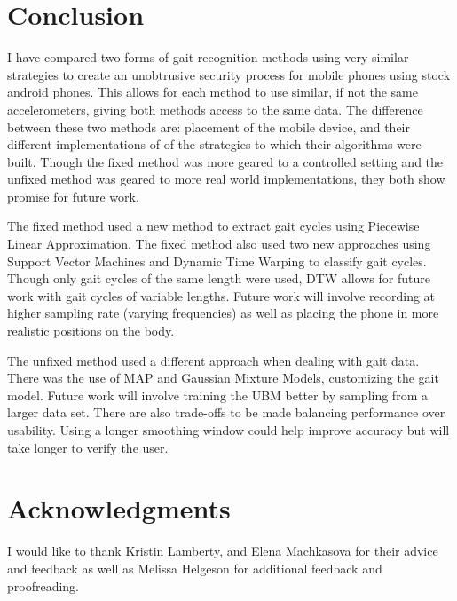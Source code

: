 \documentclass{sig-alternate}
\begin{document}

	
\section{Conclusion}
	I have compared two forms of gait recognition methods using very similar strategies to create an unobtrusive security process for mobile phones using stock android phones. This allows for each method to use similar, if not the same accelerometers, giving both methods access to the same data. The difference between these two methods are: placement of the mobile device, and their different implementations of of the strategies to which their algorithms were built. Though the fixed method was more geared to a controlled setting and the unfixed method was geared to more real world implementations, they both show promise for future work. 
	
	The fixed method used a new method to extract gait cycles using Piecewise Linear Approximation. The fixed method also used two new approaches using Support Vector Machines and Dynamic Time Warping to classify gait cycles. Though only gait cycles of the same length were used, DTW allows for future work with gait cycles of variable lengths. Future work will involve recording at higher sampling rate (varying frequencies) as well as placing the phone in more realistic positions on the body.
		
		The unfixed method used a different approach when dealing with gait data. There was the use of MAP and Gaussian Mixture Models, customizing the gait model. Future work will involve training the UBM better by sampling from a larger data set. There are also trade-offs to be made balancing performance over usability. Using a longer smoothing window could help improve accuracy but will take longer to verify the user.

\section{Acknowledgments}
	I would like to thank Kristin Lamberty, and Elena Machkasova for their advice and feedback as well as Melissa Helgeson for additional feedback and proofreading. 

\end{document}
